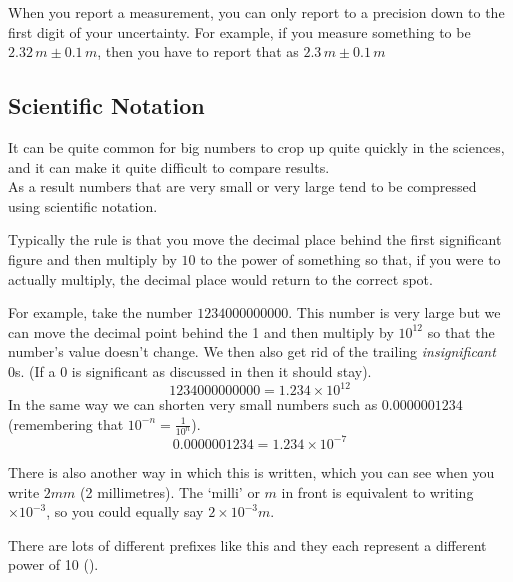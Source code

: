 \documentclass[main.tex]{subfiles}
\begin{document}
                        When you report a measurement, you can only report to a precision down to the first digit of your uncertainty. For example, if you measure something to be $2.32\,m \pm 0.1\,m$, then you have to report that as $2.3\,m \pm 0.1\,m$

                
                \newpage
                \subsection{Scientific Notation}
                    \label{subsec: Scientific Notation}

                    It can be quite common for big numbers to crop up quite quickly in the sciences, and it can make it quite difficult to compare results.\\
                    As a result numbers that are very small or very large tend to be compressed using scientific notation.

                    Typically the rule is that you move the decimal place behind the first significant figure and then multiply by $10$ to the power of something so that, if you were to actually multiply, the decimal place would return to the correct spot.

                    For example, take the number $1234000000000$. This number is very large but we can move the decimal point behind the 1 and then multiply by $10^{12}$ so that the number's value doesn't change. We then also get rid of the trailing \textit{insignificant} 0s. (If a 0 is significant as discussed in  then it should stay).
                    \begin{equation*}
                        1234000000000 = 1.234 \times 10^{12}
                    \end{equation*}
                    In the same way we can shorten very small numbers such as $0.0000001234$ (remembering that $10^{-n} = \frac{1}{10^n}$).
                    \begin{equation*}
                        0.0000001234 = 1.234 \times 10^{-7}
                    \end{equation*}


                    There is also another way in which this is written, which you can see when you write $2 mm$ (2 millimetres). The `milli' or $m$ in front is equivalent to writing $\times 10^{-3}$, so you could equally say $2\times 10^{-3} m$.

                    There are lots of different prefixes like this and they each represent a different power of 10 ().
                    \vspace{1em}
\end{document}

